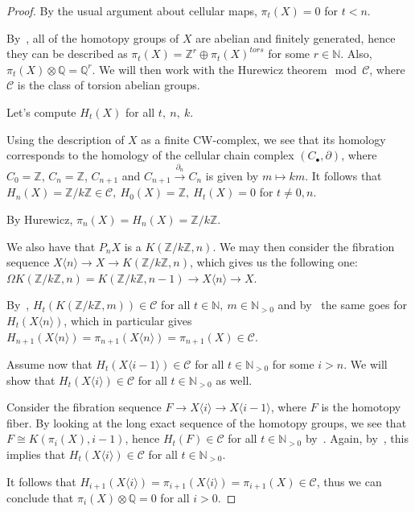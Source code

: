 \documentclass{article}
\newcommand{\numberset}{\mathbb}
\newcommand{\N}{\numberset{N}}
\newcommand{\Z}{\numberset{Z}}
\newcommand{\Q}{\numberset{Q}}
\begin{document}
\begin{proof}    
    By the usual argument about cellular maps, $\pi_t(X)=0$ for $t<n$.
    
    By~\cite[thm. 12.1]{HM19}, all of the homotopy groups of $X$ are abelian and
    finitely generated, hence they can be described as
    $\pi_t(X)=\Z^r\oplus\pi_t(X)^{tors}$ for some $r\in\N$. Also,
    $\pi_t(X)\otimes\Q=\Q^r$. We will then work with the Hurewicz
    theorem$\mod\mathcal{C}$, where $\mathcal{C}$ is the class of torsion
    abelian groups.
    
    Let's compute $H_t(X)$ for all $t,\ n,\ k$.

    Using the description of $X$ as a finite CW-complex, we see that its
    homology corresponds to the homology of the cellular chain complex
    $(C_\bullet,\partial)$, where $C_0=\Z$, $C_n=\Z$, $C_{n+1}$ and
    $C_{n+1}\xrightarrow{\partial_n}C_n$ is given by $m\mapsto km$. It follows
    that $H_n(X)=\Z/k\Z\in\mathcal{C},\ H_0(X)=\Z,\ H_t(X)=0$ for $t\neq 0,n$.

    By Hurewicz, $\pi_n(X)=H_n(X)=\Z/k\Z$.

    We also have that $P_nX$ is a $K(\Z/k\Z,n)$. We may then consider the
    fibration sequence $X\langle n\rangle\rightarrow X\rightarrow K(\Z/k\Z,n)$,
    which gives us the following one: $\Omega
    K(\Z/k\Z,n)=K(\Z/k\Z,n-1)\rightarrow X\langle n\rangle\rightarrow X$.

    By~\cite[lemma 13.16]{HM19}, $H_t(K(\Z/k\Z,m))\in\mathcal{C}$ for all
    $t\in\N,\ m\in\N_{>0}$ and by~\cite[lemma 13.15]{HM19} the same goes for
    $H_t(X\langle n\rangle)$, which in particular gives
    $H_{n+1}(X\langle n\rangle)=\pi_{n+1}(X\langle
    n\rangle)=\pi_{n+1}(X)\in\mathcal{C}$.

    Assume now that $H_t(X\langle i-1\rangle)\in\mathcal{C}$ for all
    $t\in\N_{>0}$ for some $i>n$. We will show that $H_t(X\langle
    i\rangle)\in\mathcal{C}$ for all $t\in\N_{>0}$ as well.

    Consider the fibration sequence $F\rightarrow X\langle i\rangle\rightarrow
    X\langle i-1\rangle$, where $F$ is the homotopy fiber. By looking at the
    long exact sequence of the homotopy groups, we see that $F\cong
    K(\pi_i(X),i-1)$, hence $H_t(F)\in\mathcal{C}$ for all $t\in\N_{>0}$
    by~\cite[lemma 13.16]{HM19}. Again, by~\cite[lemma 13.15]{HM19}, this
    implies that $H_t(X\langle i\rangle)\in\mathcal{C}$ for all $t\in\N_{>0}$.
    
    It follows that $H_{i+1}(X\langle i\rangle)=\pi_{i+1}(X\langle
    i\rangle)=\pi_{i+1}(X)\in\mathcal{C}$, thus we can conclude that
    $\pi_i(X)\otimes\Q=0$ for all $i>0$.
\end{proof}

\printbibliography
\end{document}
